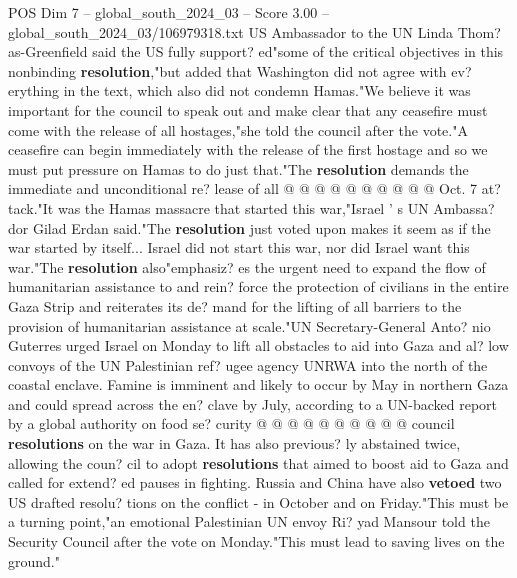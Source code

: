 \begin{textsample}{POS Dim 7 – global\_south\_2024\_03 – Score 3.00 – global\_south\_2024\_03/106979318.txt}
US Ambassador to the UN Linda Thom? as-Greenfield said the US fully support? ed"some of the critical objectives in this nonbinding \textbf{resolution},"but added that Washington did not agree with ev? erything in the text, which also did not condemn Hamas."We believe it was important for the council to speak out and make clear that any ceasefire must come with the release of all hostages,"she told the council after the vote."A ceasefire can begin immediately with the release of the first hostage and so we must put pressure on Hamas to do just that."The \textbf{resolution} demands the immediate and unconditional re? lease of all @ @ @ @ @ @ @ @ @ @ Oct. 7 at? tack."It was the Hamas massacre that started this war,"Israel ' s UN Ambassa? dor Gilad Erdan said."The \textbf{resolution} just voted upon makes it seem as if the war started by itself...
Israel did not start this war, nor did Israel want this war."The \textbf{resolution} also"emphasiz? es the urgent need to expand the flow of humanitarian assistance to and rein? force the protection of civilians in the entire Gaza Strip and reiterates its de? mand for the lifting of all barriers to the provision of humanitarian assistance at scale."UN Secretary-General Anto? nio Guterres urged Israel on Monday to lift all obstacles to aid into Gaza and al? low convoys of the UN Palestinian ref? ugee agency UNRWA into the north of the coastal enclave.
Famine is imminent and likely to occur by May in northern Gaza and could spread across the en? clave by July, according to a UN-backed report by a global authority on food se? curity @ @ @ @ @ @ @ @ @ @ council \textbf{resolutions} on the war in Gaza.
It has also previous? ly abstained twice, allowing the coun? cil to adopt \textbf{resolutions} that aimed to boost aid to Gaza and called for extend? ed pauses in fighting.
Russia and China have also \textbf{vetoed} two US drafted resolu? tions on the conflict - in October and on Friday."This must be a turning point,"an emotional Palestinian UN envoy Ri? yad Mansour told the Security Council after the vote on Monday."This must lead to saving lives on the ground."

\end{textsample}
